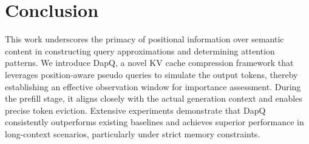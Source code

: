 \section{Conclusion}
This work underscores the primacy of positional information over semantic content in constructing query approximations and determining attention patterns. We introduce DapQ, a novel KV cache compression framework that leverages position-aware pseudo queries to simulate the output tokens, thereby establishing an effective observation window for importance assessment. During the prefill stage, it aligns closely with the actual generation context and enables precise token eviction. Extensive experiments demonstrate that DapQ consistently outperforms existing baselines and achieves superior performance in long-context scenarios, particularly under strict memory constraints. 




